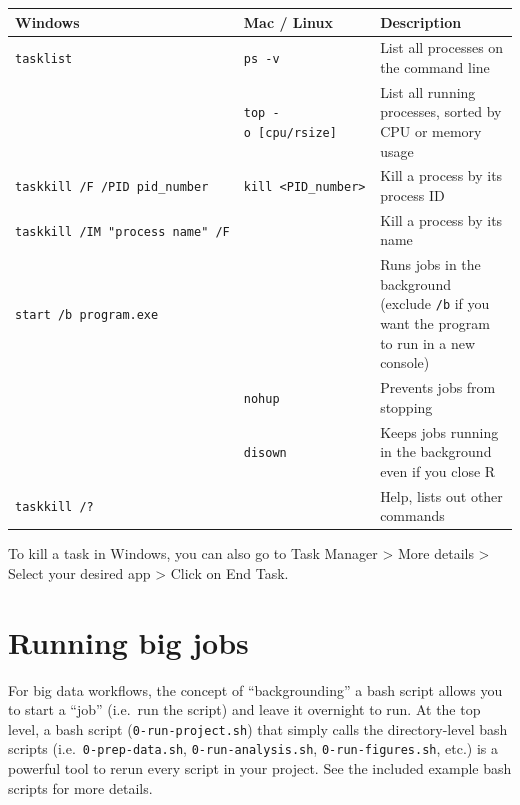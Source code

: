 \documentclass[
]{book}
\begin{document}
\begin{longtable}[]{@{}
  >{\raggedright\arraybackslash}p{}
  >{\raggedright\arraybackslash}p{}
  >{\raggedright\arraybackslash}p{}@{}}
\toprule\noalign{}
\begin{minipage}[b]{\linewidth}\raggedright
Windows
\end{minipage} & \begin{minipage}[b]{\linewidth}\raggedright
Mac / Linux
\end{minipage} & \begin{minipage}[b]{\linewidth}\raggedright
Description
\end{minipage} \\
\midrule\noalign{}
\endhead
\bottomrule\noalign{}
\endlastfoot
\texttt{tasklist} & \texttt{ps\ -v} & List all processes on the command line \\
& \texttt{top\ -o\ {[}cpu/rsize{]}} & List all running processes, sorted by CPU or memory usage \\
\texttt{taskkill\ /F\ /PID\ pid\_number} & \texttt{kill\ \textless{}PID\_number\textgreater{}} & Kill a process by its process ID \\
\texttt{taskkill\ /IM\ "process\ name"\ /F} & & Kill a process by its name \\
\texttt{start\ /b\ program.exe} & & Runs jobs in the background (exclude \texttt{/b} if you want the program to run in a new console) \\
& \texttt{nohup} & Prevents jobs from stopping \\
& \texttt{disown} & Keeps jobs running in the background even if you close R \\
\texttt{taskkill\ /?} & & Help, lists out other commands \\
\end{longtable}

To kill a task in Windows, you can also go to Task Manager \textgreater{} More details \textgreater{} Select your desired app \textgreater{} Click on End Task.

\section{Running big jobs}\label{running-big-jobs}

For big data workflows, the concept of ``backgrounding'' a bash script allows you to start a ``job'' (i.e.~run the script) and leave it overnight to run. At the top level, a bash script (\texttt{0-run-project.sh}) that simply calls the directory-level bash scripts (i.e.~\texttt{0-prep-data.sh}, \texttt{0-run-analysis.sh}, \texttt{0-run-figures.sh}, etc.) is a powerful tool to rerun every script in your project. See the included example bash scripts for more details.
\end{document}
